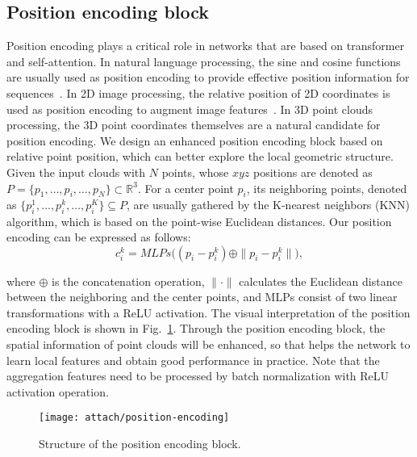 \documentclass[review]{elsarticle}
\begin{document}
\subsection{\textbf{Position encoding block}} \label{sec:PEB}
 Position encoding plays a critical role in networks that are based on transformer and self-attention. In natural language processing, the sine and cosine functions are usually used as position encoding to provide effective position information for sequences~\cite{vaswani2017attention}. In 2D image processing, the relative position of 2D coordinates is used as position encoding to augment image features~\cite{Zhao_2020_CVPR}. In 3D point clouds processing, the 3D point coordinates themselves are a natural candidate for position encoding. We design an enhanced position encoding block based on relative point position, which can better explore the local geometric structure. Given the input clouds with $N$ points, whose $xyz$ positions are denoted as $P={\{p_1},\ldots,{p_i},\ldots,{p_N}\} \subset {\mathbb{R}^{3}}$. For a center point ${p_i}$, its neighboring points, denoted as $\{p{}^1_i,\ldots,p{}^k_i,\ldots,p{}^K_i\}\subseteq P$, are usually gathered by the K-nearest neighbors (KNN) algorithm, which is based on the point-wise Euclidean distances. Our position encoding can be expressed as follows:
\begin{equation}
	\label{eq:pr}
		c{}^k_i  =  MLPs\Big(({p_i} -p{}^k_i) \oplus \parallel{p_i} -p{}^k_i\parallel\Big),
\end{equation}

\noindent where $\oplus$ is the concatenation operation, $\parallel\cdot \parallel$ calculates the Euclidean distance between the neighboring and the center points, and MLPs consist of two linear transformations with a ReLU activation. The visual interpretation of the position encoding block is shown in Fig.~\ref{fig:position-encoding}. Through the position encoding block, the spatial information of point clouds will be enhanced, so that helps the network to learn local features and obtain good performance in practice. Note that the aggregation features need to be processed by batch normalization with ReLU activation operation.

\begin{figure}[!t]
	\centering
	\texttt{[image: attach/position-encoding]}
	\caption{Structure of the position encoding block.}
	\label{fig:position-encoding}
\end{figure}
\end{document}
